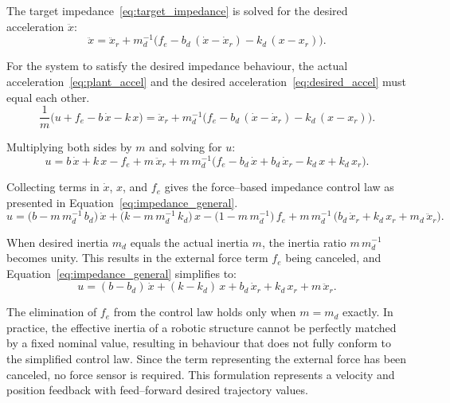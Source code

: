 \documentclass[11pt,a4paper,twoside,openright]{book}
\begin{document}
The target impedance~\eqref{eq:target_impedance} is solved for the desired acceleration $\ddot{x}$:
\begin{equation}
    \ddot{x} = \ddot{x}_{r} + m_{d}^{-1}\bigl(f_{e} - b_{d}\,(\dot{x}-\dot{x}_{r}) - k_{d}\,(x-x_{r})\bigr).
    \label{eq:desired_accel}
\end{equation}

For the system to satisfy the desired impedance behaviour, the actual acceleration~\eqref{eq:plant_accel} and the desired acceleration~\eqref{eq:desired_accel} must equal each other.
\begin{equation}
    \frac{1}{m}\bigl(u + f_{e} - b\,\dot{x} - k\,x\bigr)
    = \ddot{x}_{r} + m_{d}^{-1}\bigl(f_{e} - b_{d}\,(\dot{x}-\dot{x}_{r}) - k_{d}\,(x-x_{r})\bigr).
    \label{eq:accel_equality}
\end{equation}

Multiplying both sides by $m$ and solving for $u$:
\begin{equation}
    u = b\,\dot{x} + k\,x - f_{e}
      + m\,\ddot{x}_{r}
      + m\,m_{d}^{-1}\bigl(f_{e} - b_{d}\,\dot{x} + b_{d}\,\dot{x}_{r} - k_{d}\,x + k_{d}\,x_{r}\bigr).
    \label{eq:impedance_expanded}
\end{equation}

Collecting terms in $\dot{x}$, $x$, and $f_{e}$ gives the force--based impedance control law as presented in Equation~\eqref{eq:impedance_general}. 
\begin{equation}
    u = \bigl(b - m\,m_{d}^{-1}\,b_{d}\bigr)\,\dot{x}
      + \bigl(k - m\,m_{d}^{-1}\,k_{d}\bigr)\,x
      - \bigl(1 - m\,m_{d}^{-1}\bigr)\,f_{e}
      + m\,m_{d}^{-1}\,\bigl(b_{d}\,\dot{x}_{r} + k_{d}\,x_{r} + m_{d}\,\ddot{x}_{r}\bigr).
    \label{eq:impedance_general}
\end{equation}

When desired inertia $m_d$ equals the actual inertia $m$, the inertia ratio $m\,m_{d}^{-1}$ becomes unity. This results in the external force term $f_e$ being canceled, and Equation~\eqref{eq:impedance_general} simplifies to:
\begin{equation}
    u = (b - b_{d})\,\dot{x}
      + (k - k_{d})\,x
      + b_{d}\,\dot{x}_{r}
      + k_{d}\,x_{r}
      + m\,\ddot{x}_{r}.
    \label{eq:impedance_md_equal_m}
\end{equation}

The elimination of $f_e$ from the control law holds only when $m = m_d$ exactly. In practice, the effective inertia of a robotic structure cannot be perfectly matched by a fixed nominal value, resulting in behaviour that does not fully conform to the simplified control law. Since the term representing the external force has been canceled, no force sensor is required. This formulation represents a velocity and position feedback with feed--forward desired trajectory values. 
\end{document}
